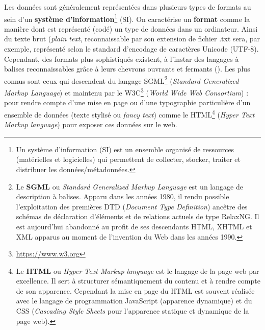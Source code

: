 Les données sont généralement représentées dans plusieurs types de formats au sein d'un \textbf{système d'information}\footnote{Un système d'information (SI) est un ensemble organisé de ressources (matérielles et logicielles) qui permettent de collecter, stocker, traiter et distribuer les données/métadonnées.} (SI). On caractérise un \textbf{format} comme la manière dont est représenté (codé) un type de données dans un ordinateur. Ainsi du texte brut (\textit{plain text}, reconnaissable par son extension de fichier .txt sera, par exemple, représenté selon le standard d'encodage de caractères Unicode (UTF-8). Cependant, des formats plus sophistiqués existent, à l'instar des langages à balises reconnaissables grâce à leurs chevrons ouvrants et fermants (\citecode{< >}). Les plus connus sont ceux qui descendent du langage SGML\footnote{Le \textbf{SGML} ou \textit{Standard Generalized Markup Language} est un langage de description à balises. Apparu dans les années 1980, il rendu possible l'exploitation des premières DTD (\textit{Document Type Definition}) ancêtre des schémas de déclaration d'éléments et de relations actuels de type RelaxNG. Il est aujourd'hui abandonné au profit de ses descendants HTML, XHTML et XML apparus au moment de l'invention du Web dans les années 1990.} (\textit{Standard Generalized Markup Language}) et maintenu par le W3C\footnote{\url{https://www.w3.org}} (\textit{World Wide Web Consortium}) : pour rendre compte d'une mise en page ou d'une typographie particulière d'un ensemble de données (texte stylisé ou \textit{fancy text}) comme le HTML\footnote{Le \textbf{HTML} ou \textit{Hyper Text Markup language} est le langage de la page web par excellence. Il sert à structurer sémantiquement du contenu et à rendre compte de son apparence. Cependant la mise en page du HTML est souvent réalisée avec le langage de programmation JavaScript (apparence dynamique) et du CSS (\textit{Cascading Style Sheets} pour l'apparence statique et dynamique de la page web).} (\textit{Hyper Text Markup language}) pour exposer ces données sur le web.\\

